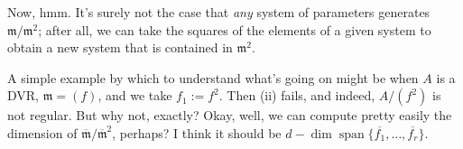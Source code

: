 \documentclass[reqno]{amsart}
\begin{document}
Now, hmm.  It's surely not the case that \emph{any} system of
parameters generates \(\mathfrak{m}/\mathfrak{m}^2\); after all,
we can take the squares of the elements of a given system to
obtain a new system that is contained in \(\mathfrak{m}^2\).

A simple example by which to understand
what's going on might be when
\(A\) is a DVR, \(\mathfrak{m} = (f)\),
and we take \(f_1 := f^2\).
Then (ii) fails, and indeed, \(A/(f^2)\) is not regular.
But why not, exactly?
Okay, well, we can compute pretty easily
the dimension of \(\overline{\mathfrak{m} } /
  \overline{\mathfrak{m} }^2\), perhaps?
I think it should be \(d - \dim \operatorname{span}
  \{\overline{f_1},\dotsc,\overline{f_r}\}\).


\subsubsection{}
\label{sec:orgdd66e74}
\end{document}
